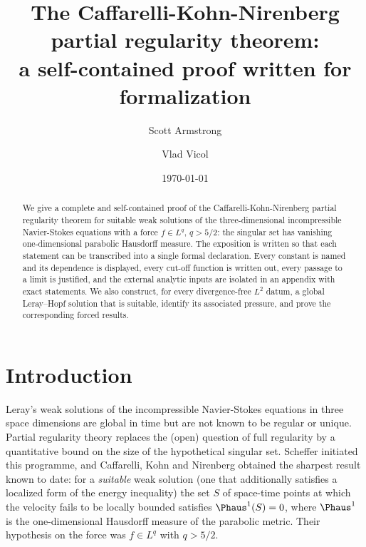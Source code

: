 \documentclass[11pt,reqno]{amsart}
\title[The Caffarelli-Kohn-Nirenberg theorem]
      {The Caffarelli-Kohn-Nirenberg partial regularity theorem:\\
       a self-contained proof written for formalization}
\author{Scott Armstrong}
\author{Vlad Vicol}
\date{\today}
\begin{document}
\begin{abstract}
We give a complete and self-contained proof of the Caffarelli-Kohn-Nirenberg
partial regularity theorem for suitable weak solutions of the three-dimensional
incompressible Navier-Stokes equations with a force $f\in L^q$, $q>5/2$: the
singular set has vanishing one-dimensional parabolic Hausdorff measure. The
exposition is written so that each statement can be transcribed into a single
formal declaration. Every constant is named and its dependence is displayed,
every cut-off function is written out, every passage to a limit is justified,
and the external analytic inputs are isolated in an appendix with exact
statements. We also construct, for every divergence-free $L^2$ datum, a global
Leray--Hopf solution that is suitable, identify its associated pressure, and
prove the corresponding forced results.
\end{abstract}

\maketitle

\setcounter{tocdepth}{1}
\tableofcontents

\section*{Introduction}

Leray's weak solutions of the incompressible Navier-Stokes equations in three
space dimensions are global in time but are not known to be regular or unique.
Partial regularity theory replaces the (open) question of full regularity by a
quantitative bound on the size of the hypothetical singular set. Scheffer
\cite{Scheffer1977} initiated this programme, and Caffarelli, Kohn and Nirenberg
\cite{CKN1982} obtained the sharpest result known to date: for a
\emph{suitable} weak solution (one that additionally satisfies a localized
form of the energy inequality) the set $S$ of space-time points at which the
velocity fails to be locally bounded satisfies $\Phaus^{1}(S)=0$, where
$\Phaus^{1}$ is the one-dimensional Hausdorff measure of the parabolic metric.
Their hypothesis on the force was $f\in L^{q}$ with $q>5/2$.
\end{document}
